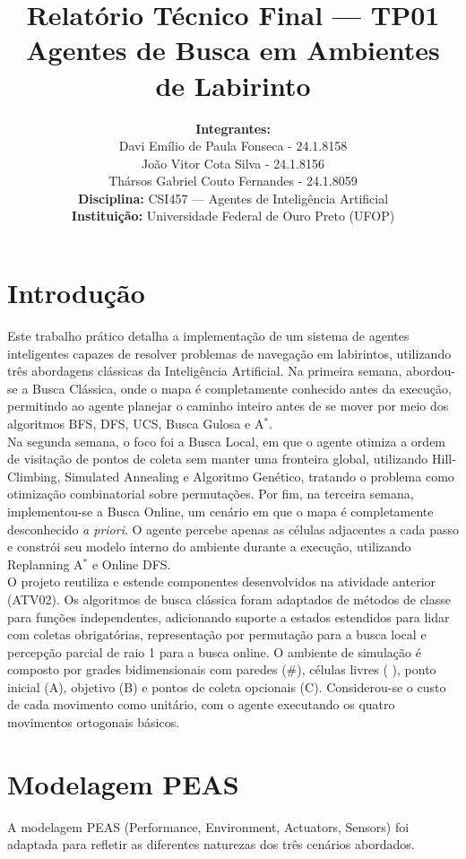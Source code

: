 \documentclass[12pt,a4paper]{article}
\title{\textbf{Relatório Técnico Final — TP01} \\ \Large Agentes de Busca em Ambientes de Labirinto}
\author{
    \textbf{Integrantes:} \\
    Davi Emílio de Paula Fonseca - 24.1.8158\\
    João Vitor Cota Silva - 24.1.8156 \\
    Thársos Gabriel Couto Fernandes - 24.1.8059\\[0.5cm]
    \textbf{Disciplina:} CSI457 — Agentes de Inteligência Artificial \\
    \textbf{Instituição:} Universidade Federal de Ouro Preto (UFOP)
}
\date{}
\begin{document}
\maketitle

\section{Introdução}
Este trabalho prático detalha a implementação de um sistema de agentes inteligentes capazes de resolver problemas de navegação em labirintos, utilizando três abordagens clássicas da Inteligência Artificial. Na primeira semana, abordou-se a Busca Clássica, onde o mapa é completamente conhecido antes da execução, permitindo ao agente planejar o caminho inteiro antes de se mover por meio dos algoritmos BFS, DFS, UCS, Busca Gulosa e A$^*$.
\\

Na segunda semana, o foco foi a Busca Local, em que o agente otimiza a ordem de visitação de pontos de coleta sem manter uma fronteira global, utilizando Hill-Climbing, Simulated Annealing e Algoritmo Genético, tratando o problema como otimização combinatorial sobre permutações. Por fim, na terceira semana, implementou-se a Busca Online, um cenário em que o mapa é completamente desconhecido \textit{a priori}. O agente percebe apenas as células adjacentes a cada passo e constrói seu modelo interno do ambiente durante a execução, utilizando Replanning A$^*$ e Online DFS.
\\

O projeto reutiliza e estende componentes desenvolvidos na atividade anterior (ATV02). Os algoritmos de busca clássica foram adaptados de métodos de classe para funções independentes, adicionando suporte a estados estendidos para lidar com coletas obrigatórias, representação por permutação para a busca local e percepção parcial de raio 1 para a busca online. O ambiente de simulação é composto por grades bidimensionais com paredes (\#), células livres ( ), ponto inicial (A), objetivo (B) e pontos de coleta opcionais (C). Considerou-se o custo de cada movimento como unitário, com o agente executando os quatro movimentos ortogonais básicos.

\section{Modelagem PEAS}
A modelagem PEAS (Performance, Environment, Actuators, Sensors) foi adaptada para refletir as diferentes naturezas dos três cenários abordados.
\end{document}
